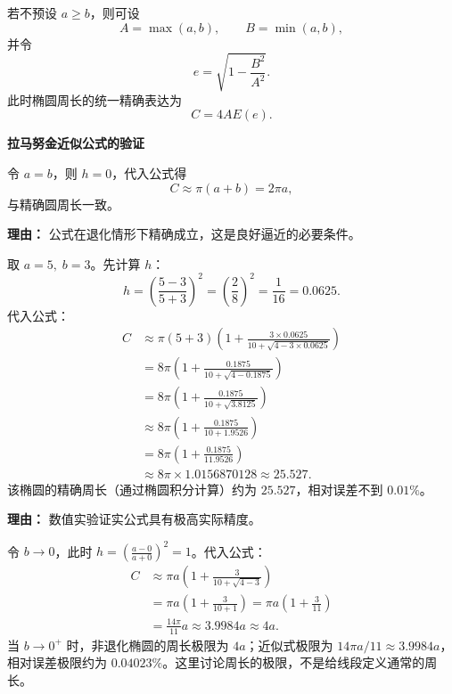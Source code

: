 \begin{proofbox}
	若不预设 \(a\ge b\)，则可设
	\[
		A=\max(a,b),
		\qquad
		B=\min(a,b),
	\]
	并令
	\[
		e=\sqrt{1-\frac{B^2}{A^2}}.
	\]
	此时椭圆周长的统一精确表达为
	\[
		\boxed{
			C=4AE(e)
		}.
	\]

	\medskip
	\textbf{\textcolor{CProof}{拉马努金近似公式的验证}}

	\begin{description}[style=nextline, leftmargin=2.8em, labelsep=0.5em, itemsep=0.55em]
		\item[\textbf{步骤一（圆极限验证）：}]
		      令 $a=b$，则 $h=0$，代入公式得
		      \[
			      C\approx \pi(a+b) = 2\pi a,
		      \]
		      与精确圆周长一致。

		      \par\textbf{理由：} 公式在退化情形下精确成立，这是良好逼近的必要条件。

		\item[\textbf{步骤二（数值精度检验）：}]
		      取 $a=5,\; b=3$。先计算 $h$：
		      \[
			      h=\left(\frac{5-3}{5+3}\right)^2
			      = \left(\frac{2}{8}\right)^2
			      = \frac{1}{16}=0.0625.
		      \]
		      代入公式：
		      \[
			      \begin{aligned}
				      C & \approx \pi(5+3)\left(1+\frac{3\times0.0625}{10+\sqrt{4-3\times0.0625}}\right) \\
				        & = 8\pi\left(1+\frac{0.1875}{10+\sqrt{4-0.1875}}\right)                         \\
				        & = 8\pi\left(1+\frac{0.1875}{10+\sqrt{3.8125}}\right)                           \\
				        & \approx 8\pi\left(1+\frac{0.1875}{10+1.9526}\right)                            \\
				        & = 8\pi\left(1+\frac{0.1875}{11.9526}\right)                                    \\
				        & \approx 8\pi\times1.0156870128 \approx 25.527.
			      \end{aligned}
		      \]
		      该椭圆的精确周长（通过椭圆积分计算）约为 $25.527$，相对误差不到 $0.01\%$。

		      \par\textbf{理由：} 数值实验证实公式具有极高实际精度。

		\item[\textbf{步骤三（极端扁平情形）：}]
		      令 $b\to 0$，此时 $h=\left(\frac{a-0}{a+0}\right)^2=1$。代入公式：
		      \[
			      \begin{aligned}
				      C
				       & \approx \pi a\left(1+\frac{3}{10+\sqrt{4-3}}\right) \\
				       & = \pi a\left(1+\frac{3}{10+1}\right)
				      = \pi a\left(1+\frac{3}{11}\right)                     \\
				       & = \frac{14\pi}{11}a
				      \approx 3.9984a
				      \approx 4a .
			      \end{aligned}
		      \]
		      当 $b\to0^+$ 时，非退化椭圆的周长极限为 $4a$；近似式极限为 $14\pi a/11\approx3.9984a$，相对误差极限约为 $0.04023\%$。这里讨论周长的极限，不是给线段定义通常的周长。


\end{description}
\end{proofbox}
